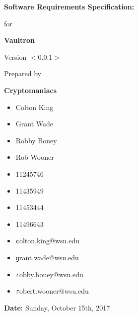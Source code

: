 \documentclass[11pt]{report}
\begin{document}

{\Huge \textbf{Software Requirements Specification:}}
\vspace{5mm}
\begin{flushright}

    {\huge for}
    \vspace{20mm}

    \textbf{\Huge Vaultron}
    \vspace{20mm}

    {\huge Version $<0.0.1>$}
    \vspace{20mm}

    {\huge Prepared by}
    \vspace{20mm}

    \textbf{\huge Cryptomaniacs}
    \vspace{20mm}
\end{flushright}

\begin{multicols}{3}
    \noindent
    \begin{itemize}
        \item[] {\Large Colton King}
        \item[] {\Large Grant Wade}
        \item[] {\Large Robby Boney}
        \item[] {\Large Rob Wooner}
    \end{itemize}

    \begin{itemize}
        \item[] {\Large 11245746}
        \item[] {\Large 11435949}
        \item[] {\Large 11453444}
        \item[] {\Large 11496643}
    \end{itemize}

    \begin{itemize}
        \item[] {\Large\texttt colton.king@wsu.edu}
        \item[] {\Large\texttt grant.wade@wsu.edu}
        \item[] {\Large\texttt robby.boney@wsu.edu}
        \item[] {\Large\texttt robert.wooner@wsu.edu}
    \end{itemize}
\end{multicols}

\vfill

\begin{flushright}
    \vspace{20mm}
    {\Large \textbf{Date:} Sunday, October 15th, 2017}
\end{flushright}
\end{document}

